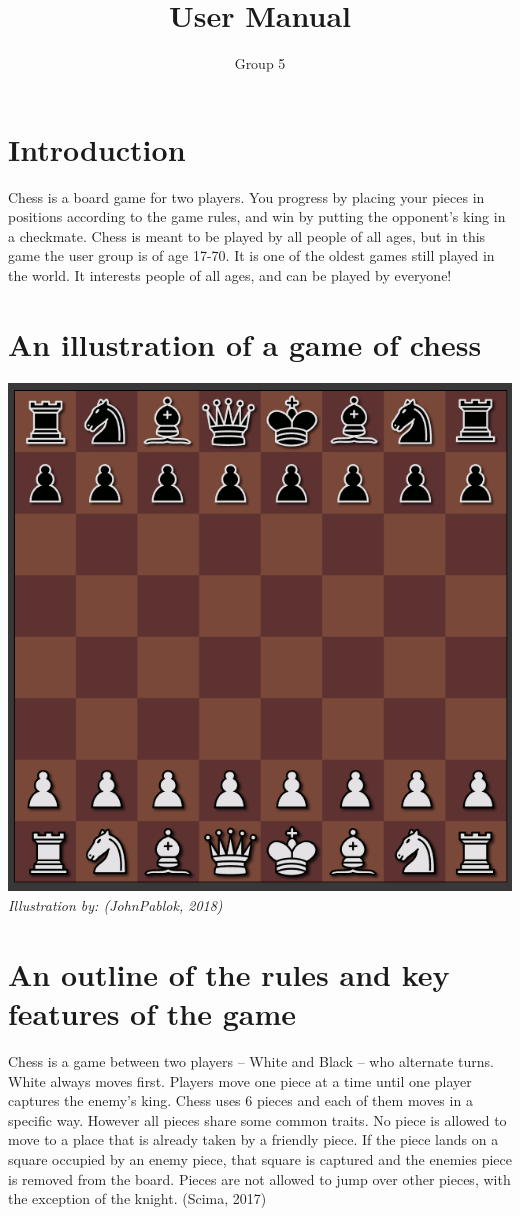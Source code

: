 \documentclass{article}
\title{User Manual}
\author{Group 5}
\date{}
\begin{document}
    \maketitle
    \section{Introduction}
    \noindent
    Chess is a board game for two players. You progress by placing your pieces in positions according to the game rules, and win by putting the opponent's king in a checkmate. Chess is meant to be played by all people of all ages, but in this game the user group is of age 17-70. It is one of the oldest games still played in the world. It interests people of all ages, and can be played by everyone!
    
    \section{An illustration of a game of chess}
    \includegraphics[scale=0.5]{image5.png} \\
    \textit{Illustration by: (JohnPablok, 2018)}
    
    \section{An outline of the rules and key features of the game}
    \noindent
    Chess is a game between two players  -- White and Black -- who alternate turns. White always moves first. Players move one piece at a time until one player captures the enemy's king.  Chess uses 6 pieces and each of them moves in a specific way. However all pieces share some common traits. No piece is allowed to move to a place that is already taken by a friendly piece. If the piece lands on a square occupied by an enemy piece, that square is captured and the enemies piece is removed from the board. Pieces are not allowed to jump over other pieces, with the exception of the knight. (Scima, 2017)
\end{document}
